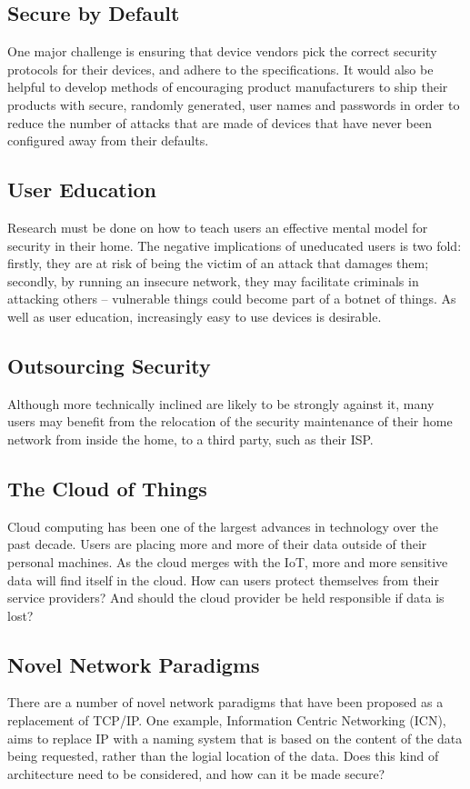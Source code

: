 \documentclass[10pt,journal,compsoc]{IEEEtran}
\begin{document}
\subsection{Secure by Default}
One major challenge is ensuring that device vendors pick the correct security
protocols for their devices, and adhere to the specifications. It would also be
helpful to develop methods of encouraging product manufacturers to ship their
products with secure, randomly generated, user names and passwords in order to
reduce the number of attacks that are made of devices that have never been
configured away from their defaults.

\subsection{User Education}
Research must be done on how to teach users an effective mental model for
security in their home. The negative implications of uneducated users is two
fold: firstly, they are at risk of being the victim of an attack that damages
them; secondly, by running an insecure network, they may facilitate criminals
in attacking others -- vulnerable things could become part of a botnet of
things. As well as user education, increasingly easy to use devices is
desirable. 

\subsection{Outsourcing Security}
Although more technically inclined are likely to be strongly against it, many
users may benefit from the relocation of the security maintenance of their home
network from inside the home, to a third party, such as their ISP. 

\subsection{The Cloud of Things}
Cloud computing has been one of the largest advances in technology over the
past decade. Users are placing more and more of their data outside of their
personal machines. As the cloud merges with the IoT, more and more sensitive
data will find itself in the cloud. How can users protect themselves from their
service providers? And should the cloud provider be held responsible if data is
lost?

\subsection{Novel Network Paradigms}
There are a number of novel network paradigms that have been proposed as a
replacement of TCP/IP. One example, Information Centric Networking (ICN), aims
to replace IP with a naming system that is based on the content of the data
being requested, rather than the logial location of the data. Does this kind of
architecture need to be considered, and how can it be made secure?
\end{document}
